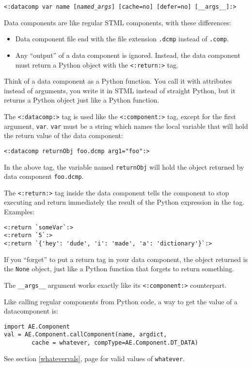 \documentclass{manual}
\begin{document}
{{\texttt{<:datacomp var name [\emph{named_args}] [cache=no] [defer=no] [__args__]:>}

Data components are like regular STML components, with these differences:

\begin{itemize}
\item Data component file end with the file extension \texttt{.dcmp}
instead of \texttt{.comp}.

\item 
Any ``output'' of a data component is ignored. Instead, the data
component must return a Python object with the \texttt{<:return:>}
tag.

\end{itemize}


Think of a data component as a Python function. 
You call it with attributes instead of arguments, you write it 
in STML instead of straight Python, but it returns a Python 
object just like a Python function.

The \texttt{<:datacomp:>} tag is used like the 
\texttt{<:component:>} 
tag, except for the first argument, \texttt{var}. 
\texttt{var} must be a string which names the local 
variable that will hold the return value of the 
data component:

\begin{verbatim}<:datacomp returnObj foo.dcmp arg1="foo":>
\end{verbatim}

In the above tag, the variable named \texttt{returnObj} 
will hold the object returned by data component \texttt{foo.dcmp}.

The \texttt{<:return:>} tag inside the data component tells
the component to stop executing and return immediately
the result of the Python expression in the tag. Examples:

\begin{verbatim}<:return `someVar`:>
<:return `5`:>
<:return `{'hey': 'dude', 'i': 'made', 'a': 'dictionary'}`:>
\end{verbatim}

If you ``forget'' to put a return tag in your data component, 
the object returned is the \texttt{None} object, just like a Python 
function that forgets to return something.

The \texttt{__args__} argument works exactly like its
\texttt{<:component:>} counterpart.

Like calling regular components from Python code, a way to get the
value of a datacomponent is:
\begin{verbatim}
import AE.Component
val = AE.Component.callComponent(name, argdict, 	
        cache = whatever, compType=AE.Component.DT_DATA)
\end{verbatim}
See section \ref{whatevervals}, page \pageref{whatevervals} for valid
values of \texttt{whatever}.

}}
\end{document}
